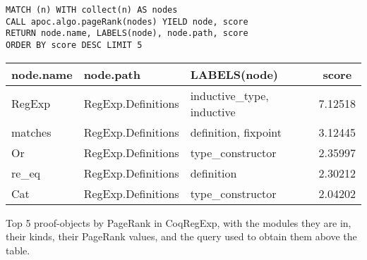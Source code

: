 \begin{verbatim}
MATCH (n) WITH collect(n) AS nodes
CALL apoc.algo.pageRank(nodes) YIELD node, score
RETURN node.name, LABELS(node), node.path, score
ORDER BY score DESC LIMIT 5
\end{verbatim}

\centering

\begin{tabular*}{\textwidth}{@{\extracolsep{\fill}} lllc}

  \toprule
 \textbf{node.name} & \textbf{node.path} & \textbf{LABELS(node)} & \textbf{score} \\

  \midrule

  RegExp   & RegExp.Definitions & inductive\_type, inductive & 7.12518 \\
  matches  & RegExp.Definitions & definition, fixpoint       & 3.12445 \\
  Or       & RegExp.Definitions & type\_constructor          & 2.35997 \\
  re\_eq   & RegExp.Definitions & definition                 & 2.30212 \\
  Cat      & RegExp.Definitions & type\_constructor          & 2.04202 \\

  \bottomrule

\end{tabular*}

\bigskip
\caption{Top 5 proof-objects by PageRank in CoqRegExp, with the modules they
  are in, their kinds, their PageRank values, and the query used to
  obtain them above the table.}\label{table:regexp:pagerank}
